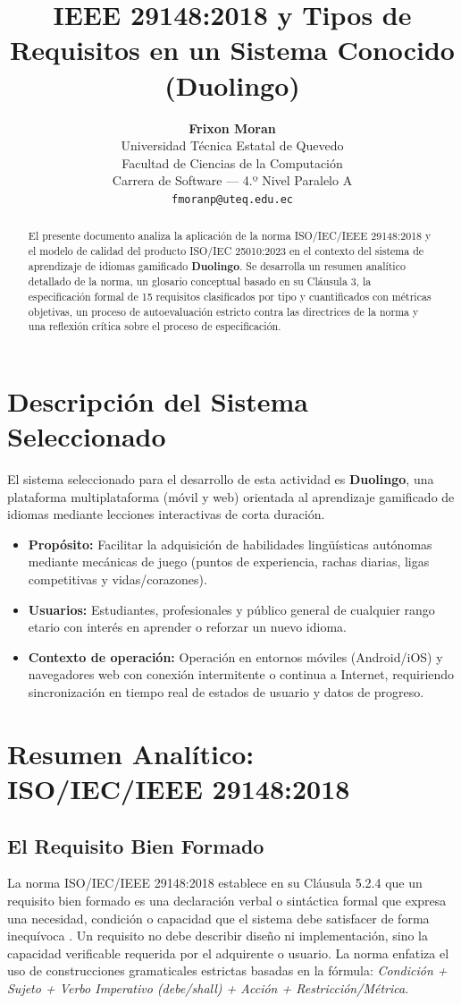 \documentclass[11pt, a4paper]{article}
\title{\textbf{IEEE 29148:2018 y Tipos de Requisitos en un Sistema Conocido (Duolingo)} \\ }
\author{\textbf{Frixon Moran} \\ Universidad Técnica Estatal de Quevedo \\ Facultad de Ciencias de la Computación \\ Carrera de Software --- 4.º Nivel Paralelo A \\ \texttt{fmoranp@uteq.edu.ec}}
\date{}
\begin{document}
\maketitle

\begin{abstract}
El presente documento analiza la aplicación de la norma ISO/IEC/IEEE 29148:2018 y el modelo de calidad del producto ISO/IEC 25010:2023 en el contexto del sistema de aprendizaje de idiomas gamificado \textbf{Duolingo}. Se desarrolla un resumen analítico detallado de la norma, un glosario conceptual basado en su Cláusula 3, la especificación formal de 15 requisitos clasificados por tipo y cuantificados con métricas objetivas, un proceso de autoevaluación estricto contra las directrices de la norma y una reflexión crítica sobre el proceso de especificación.
\end{abstract}

\section{Descripción del Sistema Seleccionado}
El sistema seleccionado para el desarrollo de esta actividad es \textbf{Duolingo}, una plataforma multiplataforma (móvil y web) orientada al aprendizaje gamificado de idiomas mediante lecciones interactivas de corta duración. 
\begin{itemize}
    \item \textbf{Propósito:} Facilitar la adquisición de habilidades lingüísticas autónomas mediante mecánicas de juego (puntos de experiencia, rachas diarias, ligas competitivas y vidas/corazones).
    \item \textbf{Usuarios:} Estudiantes, profesionales y público general de cualquier rango etario con interés en aprender o reforzar un nuevo idioma.
    \item \textbf{Contexto de operación:} Operación en entornos móviles (Android/iOS) y navegadores web con conexión intermitente o continua a Internet, requiriendo sincronización en tiempo real de estados de usuario y datos de progreso.
\end{itemize}

\section{Resumen Analítico: ISO/IEC/IEEE 29148:2018}

\subsection{El Requisito Bien Formado}
La norma ISO/IEC/IEEE 29148:2018 establece en su Cláusula 5.2.4 que un requisito bien formado es una declaración verbal o sintáctica formal que expresa una necesidad, condición o capacidad que el sistema debe satisfacer de forma inequívoca \cite{iso29148}. Un requisito no debe describir diseño ni implementación, sino la capacidad verificable requerida por el adquirente o usuario. La norma enfatiza el uso de construcciones gramaticales estrictas basadas en la fórmula: \textit{Condición + Sujeto + Verbo Imperativo (debe/shall) + Acción + Restricción/Métrica}.
\end{document}
